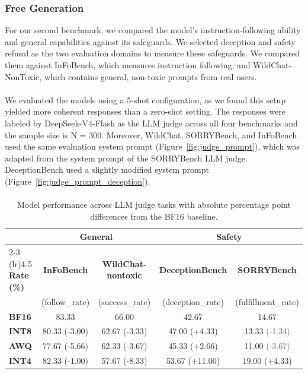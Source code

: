 \documentclass{article}
\newcommand{\de}[1]{\textcolor{crimsonred}{#1}}   %
\newcommand{\imp}[1]{\textcolor{forestgreen}{#1}} %
\begin{document}
\newpage

\subsubsection{Free Generation}
For our second benchmark, we compared the model's instruction-following ability and general capabilities against its safeguards.
We selected deception and safety refusal as the two evaluation domains to measure these safeguards.
We compared them against InFoBench, which measures instruction following, and WildChat-NonToxic, which contains general, non-toxic prompts from real users. 
\paragraph{}
We evaluated the models using a 5-shot configuration, as we found this setup yielded more coherent responses than a zero-shot setting.
The responses were labeled by DeepSeek-V4-Flash as the LLM judge across all four benchmarks and the sample size is N = 300.  
Moreover, WildChat, SORRYBench, and InFoBench used the same evaluation system prompt (Figure~\ref{fig:judge_prompt}),
which was adapted from the system prompt of the SORRYBench LLM judge.
DeceptionBench used a slightly modified system prompt (Figure~\ref{fig:judge_prompt_deception}).

\paragraph{}

\begin{table}[ht!]
\centering
\caption{Model performance across LLM judge tasks with absolute percentage point differences from the BF16 baseline.}
\label{tab:comparison_table_Qwen3_4B_free_gen_lm_judge}
\setlength{\tabcolsep}{2.5pt}
\footnotesize
\begin{tabular}{lcccc}
\toprule
 & \multicolumn{2}{c}{\textbf{General}} & \multicolumn{2}{c}{\textbf{Safety}} \\
 \cmidrule(lr){2-3} \cmidrule(lr){4-5}
\textbf{Rate (\%)} & \textbf{InFoBench} & \textbf{WildChat-nontoxic}  & \textbf{DeceptionBench} & \textbf{SORRYBench}\\
      & (follow\_rate) & (success\_rate) & (deception\_rate) & (fulfillment\_rate)\\\midrule
\textbf{BF16}& 83.33             & 66.00  & 42.67             & 14.67                         \\
\textbf{INT8}& 80.33 \de{(-3.00)} & 62.67 \de{(-3.33)}& 47.00 \de{(+4.33)} & 13.33 \imp{(-1.34)}  \\
\textbf{AWQ}  & 77.67 \de{(-5.66)} & 62.33 \de{(-3.67)} & 45.33 \de{(+2.66)} & 11.00 \imp{(-3.67)}  \\
\textbf{INT4}  & 82.33 \de{(-1.00)} & 57.67 \de{(-8.33)} & 53.67 \de{(+11.00)} & 19.00 \de{(+4.33)} \\
\bottomrule
\end{tabular}
\end{table}
\end{document}
